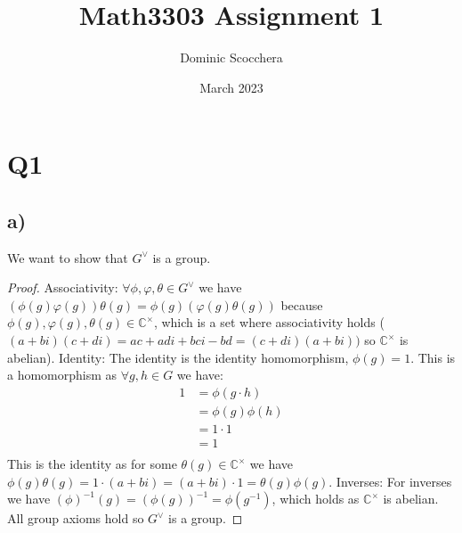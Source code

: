 \documentclass{article}
\title{Math3303 Assignment 1}
\author{Dominic Scocchera}
\date{March 2023}
\begin{document}
\maketitle
\section*{Q1}
\subsection*{a)}
We want to show that $G^\vee$ is a group.
\begin{proof}
Associativity:
\newline
$\forall\phi,\varphi,\theta\in G^\vee$ we have $(\phi(g)\varphi(g))\theta(g)=\phi(g)(\varphi(g)\theta(g))$ because $\phi(g),\varphi(g),\theta(g)\in \mathbb{C}^{\times}$, which is a set where associativity holds ($(a+bi)(c+di)=ac+adi+bci-bd=(c+di)(a+bi))$ so $\mathbb{C}^{\times}$ is abelian).
\newline\newline
Identity:
\newline
The identity is the identity homomorphism, $\phi(g)=1$. This is a homomorphism as $\forall g,h\in G$ we have:
\begin{align*}
1&=\phi(g\cdot h)\\
&=\phi(g)\phi(h)\\
&=1\cdot1\\
&=1\\
\end{align*}
This is the identity as for some $\theta(g)\in\mathbb{C}^{\times}$ we have $\phi(g)\theta(g)=1\cdot(a+bi)=(a+bi)\cdot1=\theta(g)\phi(g)$.
\newline\newline
Inverses:
For inverses we have $(\phi)^{-1}(g)=(\phi(g))^{-1}=\phi(g^{-1})$, which holds as $\mathbb{C}^{\times}$ is abelian.
\newline\newline
All group axioms hold so $G^\vee$ is a group.
\end{proof}
\end{document}
